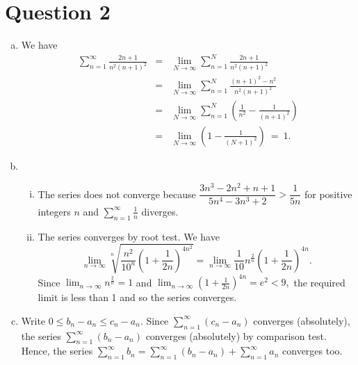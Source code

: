 \documentclass{article}
\begin{document}
\section*{Question 2}
\begin{enumerate}[(a)]
    \item We have 
    \begin{eqnarray*}
    \sum_{n=1}^{\infty}\frac{2n+1}{n^2(n+1)^2}&=&\lim_{N\to\infty}\sum_{n=1}^{N}\frac{2n+1}{n^2(n+1)^2}\\
    &=&\lim_{N\to\infty}\sum_{n=1}^{N}\frac{(n+1)^2-n^2}{n^2(n+1)^2}\\
    &=&\lim_{N\to\infty}\sum_{n=1}^{N}\left(\frac{1}{n^2}-\frac{1}{(n+1)^2}\right)\\
    &=&\lim_{N\to\infty}\left(1-\frac{1}{(N+1)^2}\right)\ =\ 1.
    \end{eqnarray*}
    \item \begin{enumerate}[(i)]
        \item The series does not converge because $\dfrac{3n^3-2n^2+n+1}{5n^4-3n^3+2}>\dfrac{1}{5n}$ for positive integers $n$ and $\displaystyle\sum^{\infty}_{n=1}\frac{1}{n}$ diverges.
        \item The series converges by root test. We have $$\lim_{n\to\infty}\sqrt[n]{\frac{n^2}{10^n}\left(1+\frac{1}{2n}\right)^{4n^2}}=\lim_{n\to\infty}\frac{1}{10}n^{\frac{2}{n}}\left(1+\frac{1}{2n}\right)^{4n}.$$
        Since $\displaystyle\lim_{n\to\infty}n^{\frac{2}{n}}=1$ and $\displaystyle\lim_{n\to\infty}\left(1+\frac{1}{2n}\right)^{4n}=e^2<9,$ the required limit is less than 1 and so the series converges.
    \end{enumerate}
    \item Write $0\leq b_n-a_n\leq c_n-a_n.$ Since $\displaystyle\sum^{\infty}_{n=1}(c_n-a_n)$ converges (absolutely), the series $\displaystyle\sum^{\infty}_{n=1}(b_n-a_n)$ converges (absolutely) by comparison test. Hence, the series $\displaystyle\sum^{\infty}_{n=1}b_n=\displaystyle\sum^{\infty}_{n=1}(b_n-a_n)+\displaystyle\sum^{\infty}_{n=1}a_n$ converges too.
\end{enumerate}
\end{document}
